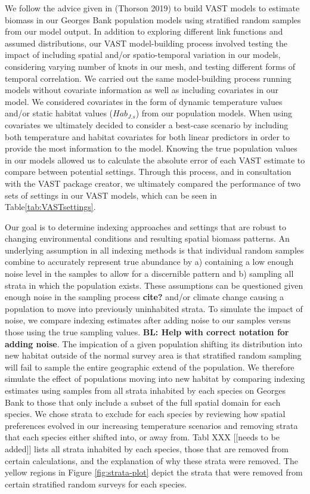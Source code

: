 \documentclass[
  12pt,
]{article}
\begin{document}
We follow the advice given in (Thorson 2019) to build VAST models to estimate biomass in our Georges Bank population models using stratified random samples from our model output. In addition to exploring different link functions and assumed distributions, our VAST model-building process involved testing the impact of including spatial and/or spatio-temporal variation in our models, considering varying number of knots in our mesh, and testing different forms of temporal correlation. We carried out the same model-building process running models without covariate information as well as including covariates in our model. We considered covariates in the form of dynamic temperature values and/or static habitat values (\(Hab_{J.s}\)) from our population models. When using covariates we ultimately decided to consider a best-case scenario by including both temperature and habitat covariates for both linear predictors in order to provide the most information to the model. Knowing the true population values in our models allowed us to calculate the absolute error of each VAST estimate to compare between potential settings. Through this process, and in consultation with the VAST package creator, we ultimately compared the performance of two sets of settings in our VAST models, which can be seen in Table\ref{tab:VASTsettings}.

Our goal is to determine indexing approaches and settings that are robust to changing environmental conditions and resulting spatial biomass patterns. An underlying assumption in all indexing methods is that individual random samples combine to accurately represent true abundance by a) containing a low enough noise level in the samples to allow for a discernible pattern and b) sampling all strata in which the population exists. These assumptions can be questioned given enough noise in the sampling process \textbf{cite?} and/or climate change causing a population to move into previously uninhabited strata. To simulate the impact of noise, we compare indexing estimates after adding noise to our samples versus those using the true sampling values. \textbf{BL: Help with correct notation for adding noise}. The impication of a given population shifting its distribution into new habitat outside of the normal survey area is that stratified random sampling will fail to sample the entire geographic extend of the population. We therefore simulate the effect of populations moving into new habitat by comparing indexing estimates using samples from all strata inhabited by each species on Georges Bank to those that only include a subset of the full spatial domain for each species. We chose strata to exclude for each species by reviewing how spatial preferences evolved in our increasing temperature scenarios and removing strata that each species either shifted into, or away from. Tabl XXX {[}{[}needs to be added{]}{]} lists all strata inhabited by each species, those that are removed from certain calculations, and the explanation of why these strata were removed. The yellow regions in Figure \ref{fig:strata-plot} depict the strata that were removed from certain stratified random surveys for each species.
\end{document}
